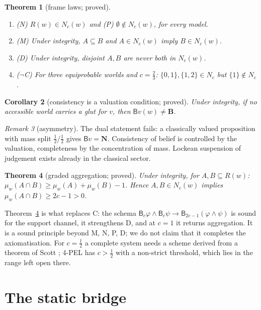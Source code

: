 \documentclass[11pt,a4paper]{article}
\newtheorem{theorem}{Theorem}[section]
\newtheorem{corollary}[theorem]{Corollary}
\theoremstyle{definition}
\theoremstyle{remark}
\newtheorem{remark}[theorem]{Remark}
\newcommand{\Bv}{\mathbf{B}}\newcommand{\Nv}{\mathbf{N}}
\newcommand{\Bel}{\mathsf{B}}
\begin{document}
\begin{theorem}[frame laws; proved]\label{thm:frame}
\begin{enumerate}[label=(\alph*),nosep]
\item \textup{(N)} $R(w)\in N_c(w)$ and \textup{(P)} $\emptyset\notin N_c(w)$, for every model.
\item \textup{(M)} Under integrity, $A\subseteq B$ and $A\in N_c(w)$ imply $B\in N_c(w)$.
\item \textup{(D)} Under integrity, disjoint $A,B$ are never both in $N_c(w)$.
\item \textup{($\neg$C)} For three equiprobable worlds and $c=\tfrac23$:
$\{0,1\},\{1,2\}\in N_c$ but $\{1\}\notin N_c$.
\end{enumerate}
\end{theorem}

\begin{corollary}[consistency is a valuation condition; proved]\label{cor:glut}
Under integrity, if no accessible world carries a glut for $v$, then $\Bel v(w)\ne\Bv$.
\end{corollary}

\begin{remark}[asymmetry]\label{rem:asym}
The dual statement fails: a classically valued proposition with mass split $\tfrac12/\tfrac12$
gives $\Bel v=\Nv$. Consistency of belief is controlled by the valuation, completeness by
the concentration of mass. Lockean suspension of judgement exists already in the classical
sector.
\end{remark}

\begin{theorem}[graded aggregation; proved]\label{thm:graded}
Under integrity, for $A,B\subseteq R(w)$: $\mu_w(A\cap B)\ge\mu_w(A)+\mu_w(B)-1$. Hence
$A,B\in N_c(w)$ implies $\mu_w(A\cap B)\ge 2c-1>0$.
\end{theorem}

Theorem~\ref{thm:graded} is what replaces C: the schema
$\Bel_c\varphi\wedge\Bel_c\psi\to\Bel_{2c-1}(\varphi\wedge\psi)$ is sound for the support
channel, it strengthens D, and at $c=1$ it returns aggregation. It is a sound principle
beyond M, N, P, D; we do not claim that it completes the axiomatisation. For
$c=\tfrac12$ a complete system needs a scheme derived from a theorem of Scott
\cite{vER2014}; 4-PEL has $c>\tfrac12$ with a non-strict threshold, which lies in the
range left open there.

\section{The static bridge}\label{sec:static}
\end{document}
